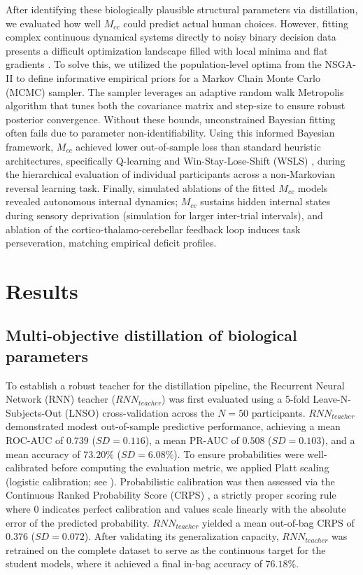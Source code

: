 \documentclass[12pt, a4paper]{extarticle}
\begin{document}
	After identifying these biologically plausible structural parameters via distillation, we evaluated how well $M_{cc}$ could predict actual human choices. However, fitting complex continuous dynamical systems directly to noisy binary decision data presents a difficult optimization landscape filled with local minima and flat gradients \parencite{daw2006}. To solve this, we utilized the population-level optima from the NSGA-II to define informative empirical priors for a Markov Chain Monte Carlo (MCMC) sampler. The sampler leverages an adaptive random walk Metropolis algorithm that tunes both the covariance matrix \parencite{haario2001} and step-size \parencite{roberts2009} to ensure robust posterior convergence. Without these bounds, unconstrained Bayesian fitting often fails due to parameter non-identifiability. Using this informed Bayesian framework, $M_{cc}$ achieved lower out-of-sample loss than standard heuristic architectures, specifically Q-learning \parencite{watkinsQlearning1992} and Win-Stay-Lose-Shift (WSLS) \parencite{nowakWinStayLoseShiftStrategy1993}, during the hierarchical evaluation of individual participants across a non-Markovian reversal learning task. Finally, simulated ablations of the fitted $M_{cc}$ models revealed autonomous internal dynamics; $M_{cc}$ sustains hidden internal states during sensory deprivation (simulation for larger inter-trial intervals), and ablation of the cortico-thalamo-cerebellar feedback loop induces task perseveration, matching empirical deficit profiles.
	
\section{Results}

\subsection{Multi-objective distillation of biological parameters}

To establish a robust teacher for the distillation pipeline, the Recurrent Neural Network (RNN) teacher ($RNN_{teacher}$) was first evaluated using a 5-fold Leave-N-Subjects-Out (LNSO) cross-validation across the $N = 50$ participants. $RNN_{teacher}$ demonstrated modest out-of-sample predictive performance, achieving a mean ROC-AUC of $0.739$ ($SD = 0.116$), a mean PR-AUC of $0.508$ ($SD = 0.103$), and a mean accuracy of $73.20\%$ ($SD = 6.08\%$). To ensure probabilities were well-calibrated before computing the evaluation metric, we applied Platt scaling (logistic calibration; see ). Probabilistic calibration was then assessed via the Continuous Ranked Probability Score (CRPS) \parencite{gneiting2007strictly}, a strictly proper scoring rule where $0$ indicates perfect calibration and values scale linearly with the absolute error of the predicted probability. $RNN_{teacher}$ yielded a mean out-of-bag CRPS of $0.376$ ($SD = 0.072$). After validating its generalization capacity, $RNN_{teacher}$ was retrained on the complete dataset to serve as the continuous target for the student models, where it achieved a final in-bag accuracy of $76.18\%$.
\end{document}
